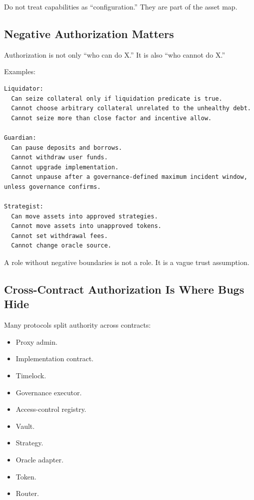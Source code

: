 Do not treat capabilities as ``configuration.'' They are part of the
asset map.

\subsection{Negative Authorization Matters}

Authorization is not only ``who can do X.'' It is also ``who cannot do
X.''

Examples:

\begin{lstlisting}
Liquidator:
  Can seize collateral only if liquidation predicate is true.
  Cannot choose arbitrary collateral unrelated to the unhealthy debt.
  Cannot seize more than close factor and incentive allow.

Guardian:
  Can pause deposits and borrows.
  Cannot withdraw user funds.
  Cannot upgrade implementation.
  Cannot unpause after a governance-defined maximum incident window, unless governance confirms.

Strategist:
  Can move assets into approved strategies.
  Cannot move assets into unapproved tokens.
  Cannot set withdrawal fees.
  Cannot change oracle source.
\end{lstlisting}

A role without negative boundaries is not a role. It is a vague trust
assumption.

\subsection{Cross-Contract Authorization Is Where Bugs Hide}

Many protocols split authority across contracts:

\begin{itemize}
\tightlist
\item
  Proxy admin.
\item
  Implementation contract.
\item
  Timelock.
\item
  Governance executor.
\item
  Access-control registry.
\item
  Vault.
\item
  Strategy.
\item
  Oracle adapter.
\item
  Token.
\item
  Router.
\end{itemize}

